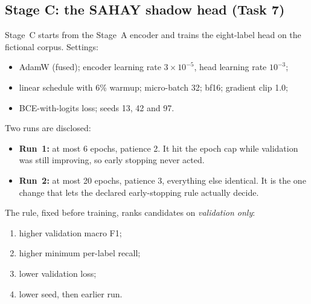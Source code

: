 \documentclass[11pt,a4paper]{article}
\begin{document}
\subsection{Stage C: the SAHAY shadow head (Task 7)}
Stage~C starts from the Stage~A encoder and trains the eight-label head on the fictional corpus.
Settings:
\begin{itemize}
  \item AdamW (fused); encoder learning rate $3\times10^{-5}$, head learning rate $10^{-3}$;
  \item linear schedule with 6\% warmup; micro-batch 32; bf16; gradient clip 1.0;
  \item BCE-with-logits loss; seeds 13, 42 and 97.
\end{itemize}
Two runs are disclosed:
\begin{itemize}
  \item \textbf{Run~1:} at most 6 epochs, patience 2. It hit the epoch cap while validation was
        still improving, so early stopping never acted.
  \item \textbf{Run~2:} at most 20 epochs, patience 3, everything else identical. It is the one
        change that lets the declared early-stopping rule actually decide.
\end{itemize}
The rule, fixed before training, ranks candidates on \emph{validation only}:
\begin{enumerate}
  \item higher validation macro F1;
  \item higher minimum per-label recall;
  \item lower validation loss;
  \item lower seed, then earlier run.
\end{enumerate}
\end{document}
